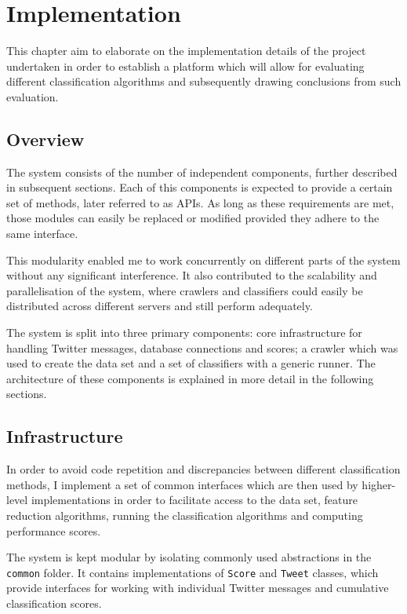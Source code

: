 \chapter{Implementation}

This chapter aim to elaborate on the implementation details of the project undertaken in order to establish a platform which will allow for evaluating different classification algorithms and subsequently drawing conclusions from such evaluation.

\section{Overview}

The system consists of the number of independent components, further described in subsequent sections. Each of this components is expected to provide a certain set of methods, later referred to as APIs. As long as these requirements are met, those modules can easily be replaced or modified provided they adhere to the same interface.

This modularity enabled me to work concurrently on different parts of the system without any significant interference. It also contributed to the scalability and parallelisation of the system, where crawlers and classifiers could easily be distributed across different servers and still perform adequately.

The system is split into three primary components: core infrastructure for handling Twitter messages, database connections and scores; a crawler which was used to create the data set and a set of classifiers with a generic runner. The architecture of these components is explained in more detail in the following sections.

\section{Infrastructure}

In order to avoid code repetition and discrepancies between different classification methods, I implement a set of common interfaces which are then used by higher-level implementations in order to facilitate access to the data set, feature reduction algorithms, running the classification algorithms and computing performance scores.

The system is kept modular by isolating commonly used abstractions in the \verb|common| folder. It contains implementations of \verb|Score| and \verb|Tweet| classes, which provide interfaces for working with individual Twitter messages and cumulative classification scores.

